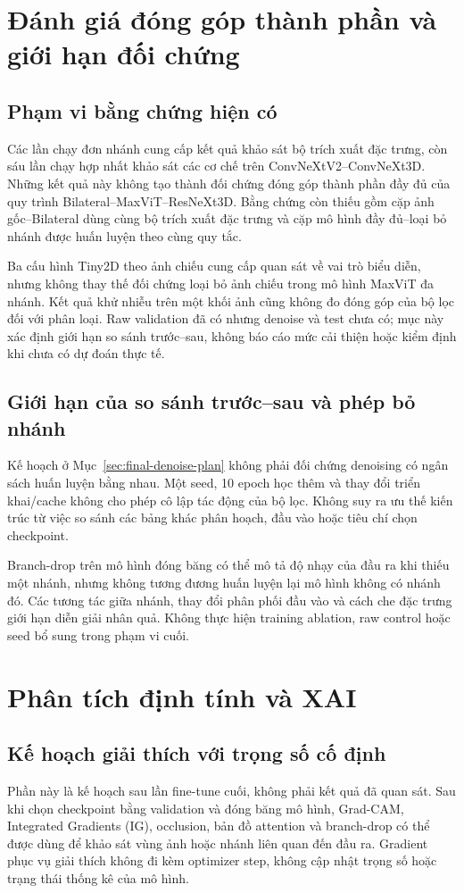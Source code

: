 \documentclass[14pt,a4paper,oneside]{extreport}
\begin{document}
\section{Đánh giá đóng góp thành phần và giới hạn đối chứng}
\label{sec:ablation}
\subsection{Phạm vi bằng chứng hiện có}
Các lần chạy đơn nhánh cung cấp kết quả khảo sát bộ trích xuất đặc trưng,
còn sáu lần chạy hợp nhất khảo sát các cơ chế trên ConvNeXtV2--ConvNeXt3D.
Những kết quả này không tạo thành đối chứng đóng góp thành phần đầy đủ
của quy trình Bilateral--MaxViT--ResNeXt3D. Bằng chứng còn thiếu gồm
cặp ảnh gốc--Bilateral dùng cùng bộ trích xuất đặc trưng và cặp mô hình
đầy đủ--loại bỏ nhánh được huấn luyện theo cùng quy tắc.

Ba cấu hình Tiny2D theo ảnh chiếu cung cấp quan sát về vai trò biểu
diễn, nhưng không thay thế đối chứng loại bỏ ảnh chiếu trong mô hình MaxViT đa
nhánh. Kết quả khử nhiễu trên một khối ảnh cũng không đo đóng góp của
bộ lọc đối với phân loại. Raw validation đã có nhưng denoise và test
chưa có; mục này xác định giới hạn so sánh trước--sau,
không báo cáo mức cải thiện hoặc kiểm định khi chưa có dự đoán thực tế.

\subsection{Giới hạn của so sánh trước--sau và phép bỏ nhánh}
Kế hoạch ở Mục~\ref{sec:final-denoise-plan} không phải đối chứng
denoising có ngân sách huấn luyện bằng nhau. Một seed, 10 epoch học
thêm và thay đổi triển khai/cache không cho phép cô lập tác động của
bộ lọc. Không suy ra ưu thế kiến trúc từ việc so sánh các bảng khác
phân hoạch, đầu vào hoặc tiêu chí chọn checkpoint.

Branch-drop trên mô hình đóng băng có thể mô tả độ nhạy của đầu ra
khi thiếu một nhánh, nhưng không tương đương huấn luyện lại mô hình
không có nhánh đó. Các tương tác giữa nhánh, thay đổi phân phối đầu
vào và cách che đặc trưng giới hạn diễn giải nhân quả. Không thực
hiện training ablation, raw control hoặc seed bổ sung trong phạm vi cuối.
\FloatBarrier

\section{Phân tích định tính và XAI}
\label{sec:qualitative-xai}
\subsection{Kế hoạch giải thích với trọng số cố định}
Phần này là kế hoạch sau lần fine-tune cuối, không phải kết quả đã
quan sát. Sau khi chọn checkpoint bằng validation và đóng băng mô
hình, Grad-CAM, Integrated Gradients (IG), occlusion, bản đồ attention
và branch-drop có thể được dùng để khảo sát vùng ảnh hoặc nhánh liên
quan đến đầu ra. Gradient phục vụ giải thích không đi kèm optimizer
step, không cập nhật trọng số hoặc trạng thái thống kê của mô hình.
\end{document}
